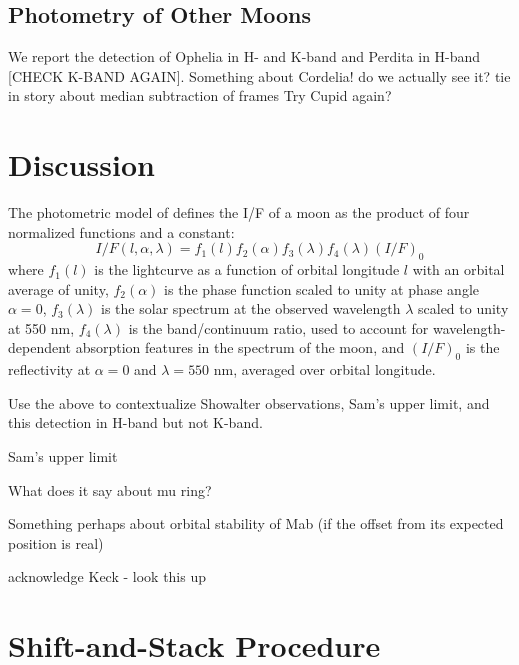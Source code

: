 \documentclass[preprint]{aastex631}
\begin{document}
\subsection{Photometry of Other Moons}

We report the detection of Ophelia in H- and K-band and Perdita in H-band [CHECK K-BAND AGAIN].
Something about Cordelia! do we actually see it?
tie in story about median subtraction of frames
Try Cupid again?

\section{Discussion}
\label{s:discussion}

The photometric model of \citet{karkoschka01} defines the I/F of a moon as the product of four normalized functions and a constant:
\begin{equation}
	\label{eq:if}
	I/F(l, \alpha, \lambda) = f_1(l) f_2(\alpha) f_3(\lambda) f_4(\lambda) (I/F)_0
\end{equation}
where $f_1(l)$ is the lightcurve as a function of orbital longitude $l$ with an orbital average of unity, $f_2(\alpha)$ is the phase function scaled to unity at phase angle $\alpha = 0$, $f_3(\lambda)$ is the solar spectrum at the observed wavelength $\lambda$ scaled to unity at 550 nm, $f_4(\lambda)$ is the band/continuum ratio, used to account for wavelength-dependent absorption features in the spectrum of the moon, and $(I/F)_0$ is the reflectivity at $\alpha = 0$ and $\lambda = 550$ nm, averaged over orbital longitude.

Use the above to contextualize Showalter observations, Sam's upper limit, and this detection in H-band but not K-band.

Sam's upper limit

What does it say about mu ring?

Something perhaps about orbital stability of Mab (if the offset from its expected position is real)

\acknowledgements

acknowledge Keck - look this up

\appendix

\section{Shift-and-Stack Procedure}
\label{s:shiftandstack}
\end{document}
